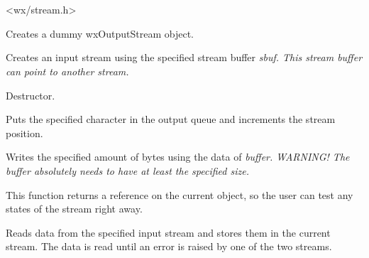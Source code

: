 \section{}\label{wxoutputstream}




<wx/stream.h>





Creates a dummy wxOutputStream object.


Creates an input stream using the specified stream buffer \it{sbuf}. This
stream buffer can point to another stream.



Destructor.



Puts the specified character in the output queue and increments the
stream position.



Writes the specified amount of bytes using the data of \it{buffer}. 
\it{WARNING!} The buffer absolutely needs to have at least the specified size.

This function returns a reference on the current object, so the user can test
any states of the stream right away.


Reads data from the specified input stream and stores them 
in the current stream. The data is read until an error is raised
by one of the two streams.

